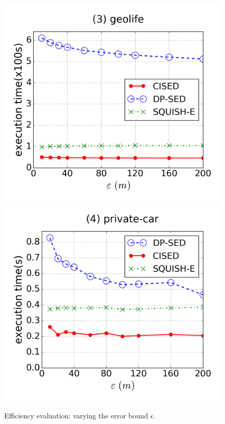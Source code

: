 \begin{figure}[tb!]
\includegraphics[scale = 0.24]{figures/Exp-time-epsilon-geolife.png}
\includegraphics[scale = 0.24]{figures/Exp-time-epsilon-private.png}
\vspace{-3ex}
\caption{\small Efficiency evaluation: varying the error bound $\epsilon$.}
\label{fig:time-epsilon}
\vspace{-1ex}
\end{figure}


